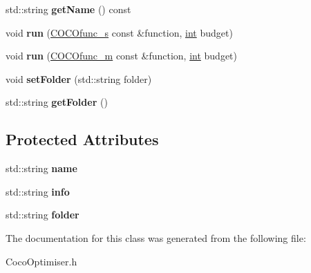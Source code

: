 \begin{DoxyCompactItemize}
\item 
std\+::string {\bfseries get\+Name} () const \hypertarget{classCocoOptimiser_a265bd5d524ea5b10d5e9f4028cdc386c}{}\label{classCocoOptimiser_a265bd5d524ea5b10d5e9f4028cdc386c}

\item 
void {\bfseries run} (\hyperlink{classCOCOfunc__s}{C\+O\+C\+Ofunc\+\_\+s} const \&function, \hyperlink{classint}{int} budget)\hypertarget{classCocoOptimiser_a5842d02046cb097f0e11c84329f32799}{}\label{classCocoOptimiser_a5842d02046cb097f0e11c84329f32799}

\item 
void {\bfseries run} (\hyperlink{classCOCOfunc__m}{C\+O\+C\+Ofunc\+\_\+m} const \&function, \hyperlink{classint}{int} budget)\hypertarget{classCocoOptimiser_a1ad475649fa2f85129a8db7457cffeab}{}\label{classCocoOptimiser_a1ad475649fa2f85129a8db7457cffeab}

\item 
void {\bfseries set\+Folder} (std\+::string folder)\hypertarget{classCocoOptimiser_a2bfb5ff0b5420e95c6736070d4853eea}{}\label{classCocoOptimiser_a2bfb5ff0b5420e95c6736070d4853eea}

\item 
std\+::string {\bfseries get\+Folder} ()\hypertarget{classCocoOptimiser_aedb7b8bd6951c363b3ecbeb878cd0539}{}\label{classCocoOptimiser_aedb7b8bd6951c363b3ecbeb878cd0539}

\end{DoxyCompactItemize}
\subsection*{Protected Attributes}
\begin{DoxyCompactItemize}
\item 
std\+::string {\bfseries name}\hypertarget{classCocoOptimiser_a6832a1c556a6af0f47b0e1de31fc7488}{}\label{classCocoOptimiser_a6832a1c556a6af0f47b0e1de31fc7488}

\item 
std\+::string {\bfseries info}\hypertarget{classCocoOptimiser_a01d71a1cc52374efb3d9e0b4c80e44e7}{}\label{classCocoOptimiser_a01d71a1cc52374efb3d9e0b4c80e44e7}

\item 
std\+::string {\bfseries folder}\hypertarget{classCocoOptimiser_a92f48d32c1606ebee1f3d4d432553f4c}{}\label{classCocoOptimiser_a92f48d32c1606ebee1f3d4d432553f4c}

\end{DoxyCompactItemize}


The documentation for this class was generated from the following file\+:\begin{DoxyCompactItemize}
\item 
Coco\+Optimiser.\+h\end{DoxyCompactItemize}
